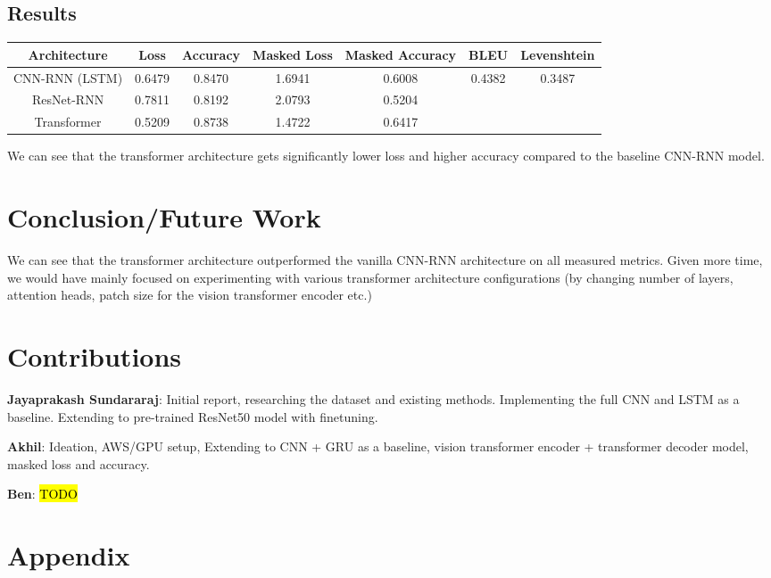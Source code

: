 \documentclass{article}
\newcommand{\hlblue}[1]{\hl{#1}}
\begin{document}
\subsection{Results}
\begin{center}
\begin{tabular}{||c | c | c | c | c | c | c ||} 
 \hline
 Architecture & Loss & Accuracy & Masked Loss & Masked Accuracy & BLEU & Levenshtein \\ [0.5ex] 
 \hline\hline
 CNN-RNN (LSTM) & 0.6479 & 0.8470 & 1.6941 & 0.6008 & 0.4382 & 0.3487 \\ 
 \hline
ResNet-RNN  & 0.7811  & 0.8192 & 2.0793  & 0.5204 \\ 
 \hline
Transformer  & 0.5209 & 0.8738 & 1.4722 & 0.6417 \\
 \hline
\end{tabular}
\end{center}

We can see that the transformer architecture gets significantly lower loss and higher accuracy compared to the baseline CNN-RNN model.

\section{Conclusion/Future Work}
We can see that the transformer architecture outperformed the vanilla CNN-RNN architecture on all measured metrics. Given more time, we would have mainly focused on experimenting with various transformer architecture configurations (by changing number of layers, attention heads, patch size for the vision transformer encoder etc.)

\section{Contributions}

\textbf{Jayaprakash Sundararaj}: Initial report, researching the dataset and existing methods. Implementing the full CNN and LSTM as a baseline. Extending to pre-trained ResNet50 model with finetuning.

\textbf{Akhil}: Ideation, AWS/GPU setup, Extending to CNN + GRU as a baseline, vision transformer encoder + transformer decoder model, masked loss and accuracy.

\textbf{Ben}: \hlblue{TODO}

\medskip

\nocite{*}


\section{Appendix}
\end{document}
